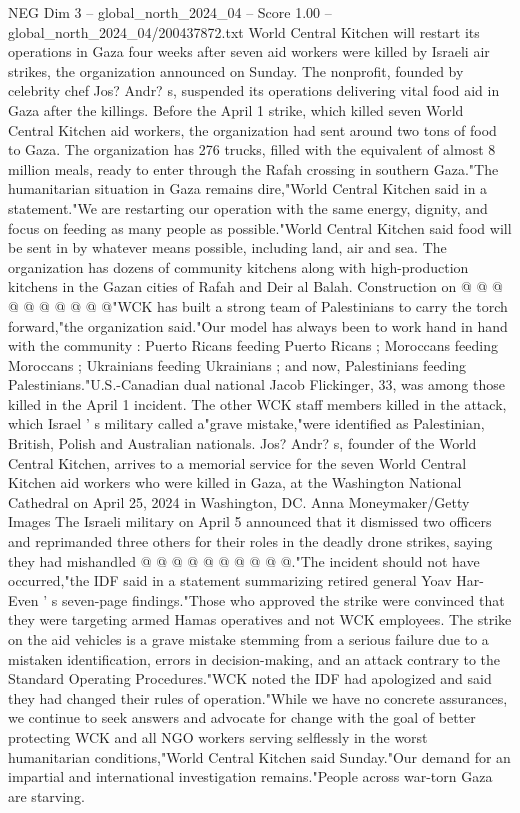 \begin{textsample}{NEG Dim 3 – global\_north\_2024\_04 – Score 1.00 – global\_north\_2024\_04/200437872.txt}  \label{ex:f3_neg_402}
World Central Kitchen will restart its operations in Gaza four weeks after seven aid workers were killed by Israeli air strikes, the organization announced on Sunday.
The nonprofit, founded by celebrity chef Jos?
Andr? s, suspended its operations delivering vital food aid in Gaza after the killings.
Before the April 1 strike, which killed seven World Central Kitchen aid workers, the organization had sent around two tons of food to Gaza.
The organization has 276 trucks, filled with the equivalent of almost 8 million meals, ready to enter through the Rafah crossing in southern Gaza."The humanitarian situation in Gaza remains dire,"World Central Kitchen said in a statement."We are restarting our operation with the same energy, dignity, and focus on feeding as many people as possible."World Central Kitchen said food will be sent in by whatever means possible, including land, air and sea.
The organization has dozens of community kitchens along with high-production kitchens in the Gazan cities of Rafah and Deir al Balah.
Construction on @ @ @ @ @ @ @ @ @ @"WCK has built a strong team of Palestinians to carry the torch forward,"the organization said."Our model has always been to work hand in hand with the community : Puerto Ricans feeding Puerto Ricans ; Moroccans feeding Moroccans ; Ukrainians feeding Ukrainians ; and now, Palestinians feeding Palestinians."U.S.-Canadian dual national Jacob Flickinger, 33, was among those killed in the April 1 incident.
The other WCK staff members killed in the attack, which Israel ' s military called a"grave mistake,"were identified as Palestinian, British, Polish and Australian nationals.
Jos?
Andr? s, founder of the World Central Kitchen, arrives to a memorial service for the seven World Central Kitchen aid workers who were killed in Gaza, at the Washington National Cathedral on April 25, 2024 in Washington, DC.
Anna Moneymaker/Getty Images The Israeli military on April 5 announced that it dismissed two officers and reprimanded three others for their roles in the deadly drone strikes, saying they had mishandled @ @ @ @ @ @ @ @ @ @."The incident should not have occurred,"the IDF said in a statement summarizing retired general Yoav Har-Even ' s seven-page findings."Those who approved the strike were convinced that they were targeting armed Hamas operatives and not WCK employees.
The strike on the aid vehicles is a grave mistake stemming from a serious failure due to a mistaken identification, errors in decision-making, and an attack contrary to the Standard Operating Procedures."WCK noted the IDF had apologized and said they had changed their rules of operation."While we have no concrete assurances, we continue to seek answers and advocate for change with the goal of better protecting WCK and all NGO workers serving selflessly in the worst humanitarian conditions,"World Central Kitchen said Sunday."Our demand for an impartial and international investigation remains."People across war-torn Gaza are starving.

\end{textsample}
